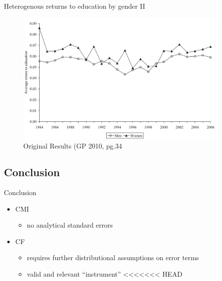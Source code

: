 \documentclass[10pt,ignorenonframetext,]{beamer}
\providecommand{\tightlist}{%
  \setlength{\itemsep}{0pt}\setlength{\parskip}{0pt}}
\begin{document}
\begin{frame}{Heterogenous returns to education by gender II}
\protect\hypertarget{heterogenous-returns-to-education-by-gender-ii}{}

\begin{figure}
\centering
\includegraphics[width=\textwidth,height=2.60417in]{img/GP2010_CMI_gender.png}
\caption{Original Results (GP 2010, pg.34}
\end{figure}

\end{frame}

\hypertarget{conclusion}{%
\subsection{Conclusion}\label{conclusion}}

\begin{frame}{Conclusion}
\protect\hypertarget{conclusion-1}{}

\begin{itemize}
\tightlist
\item
  CMI

  \begin{itemize}
  \tightlist
  \item
    no analytical standard errors
  \end{itemize}
\item
  CF

  \begin{itemize}
  \tightlist
  \item
    requires further distributional assumptions on error terms
  \item
    valid and relevant ``instrument''
    \textless{}\textless{}\textless{}\textless{}\textless{}\textless{}\textless{}
    HEAD
  \end{itemize}
\end{itemize}

\end{frame}
\end{document}
